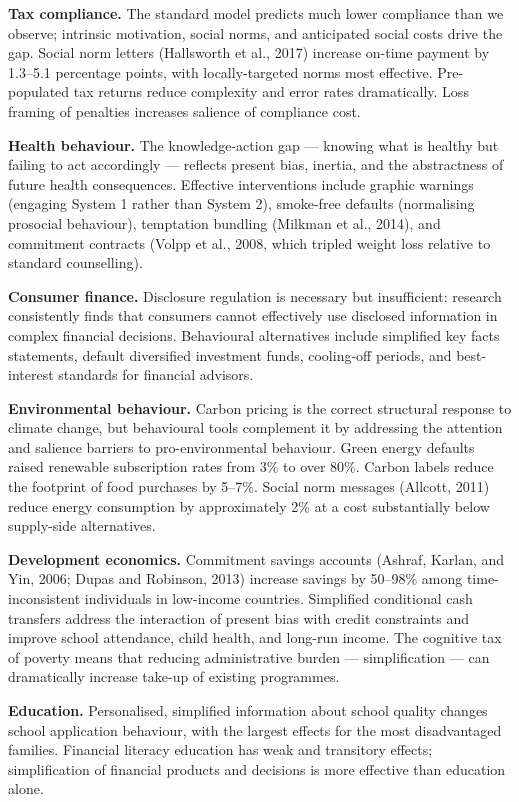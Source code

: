 \documentclass[12pt, letterpaper]{article}
\begin{document}
\textbf{Tax compliance.} The standard model predicts much lower compliance than we observe; intrinsic motivation, social norms, and anticipated social costs drive the gap. Social norm letters (Hallsworth et al., 2017) increase on-time payment by 1.3--5.1 percentage points, with locally-targeted norms most effective. Pre-populated tax returns reduce complexity and error rates dramatically. Loss framing of penalties increases salience of compliance cost.

\textbf{Health behaviour.} The knowledge-action gap --- knowing what is healthy but failing to act accordingly --- reflects present bias, inertia, and the abstractness of future health consequences. Effective interventions include graphic warnings (engaging System 1 rather than System 2), smoke-free defaults (normalising prosocial behaviour), temptation bundling (Milkman et al., 2014), and commitment contracts (Volpp et al., 2008, which tripled weight loss relative to standard counselling).

\textbf{Consumer finance.} Disclosure regulation is necessary but insufficient: research consistently finds that consumers cannot effectively use disclosed information in complex financial decisions. Behavioural alternatives include simplified key facts statements, default diversified investment funds, cooling-off periods, and best-interest standards for financial advisors.

\textbf{Environmental behaviour.} Carbon pricing is the correct structural response to climate change, but behavioural tools complement it by addressing the attention and salience barriers to pro-environmental behaviour. Green energy defaults raised renewable subscription rates from 3\% to over 80\%. Carbon labels reduce the footprint of food purchases by 5--7\%. Social norm messages (Allcott, 2011) reduce energy consumption by approximately 2\% at a cost substantially below supply-side alternatives.

\textbf{Development economics.} Commitment savings accounts (Ashraf, Karlan, and Yin, 2006; Dupas and Robinson, 2013) increase savings by 50--98\% among time-inconsistent individuals in low-income countries. Simplified conditional cash transfers address the interaction of present bias with credit constraints and improve school attendance, child health, and long-run income. The cognitive tax of poverty means that reducing administrative burden --- simplification --- can dramatically increase take-up of existing programmes.

\textbf{Education.} Personalised, simplified information about school quality changes school application behaviour, with the largest effects for the most disadvantaged families. Financial literacy education has weak and transitory effects; simplification of financial products and decisions is more effective than education alone.
\end{document}
